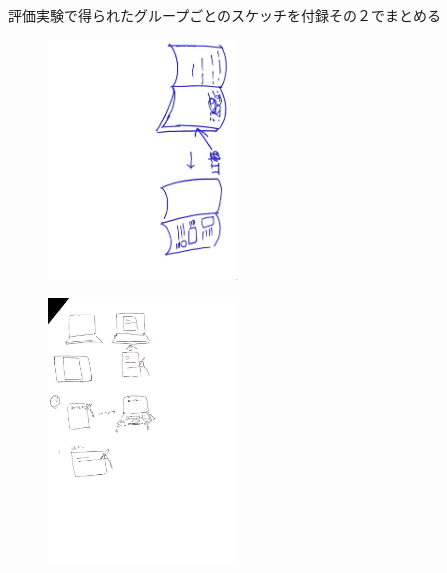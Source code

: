\documentclass{funthesis}
\begin{document}
評価実験で得られたグループごとのスケッチを付録その２でまとめる
\begin{figure}[H]
 \begin{minipage}{0.47\hsize}
 \begin{center}
\includegraphics[width=50mm]{figures/group1.jpg}
 \end{center}
 \label{fig:seven}
 \end{minipage}
 \begin{minipage}{0.47\hsize}
 \begin{center}
 \includegraphics[width=50mm]{figures/group2.jpg}
 \end{center}
 \label{fig:eight}
 \end{minipage}
\end{figure}
\end{document}
